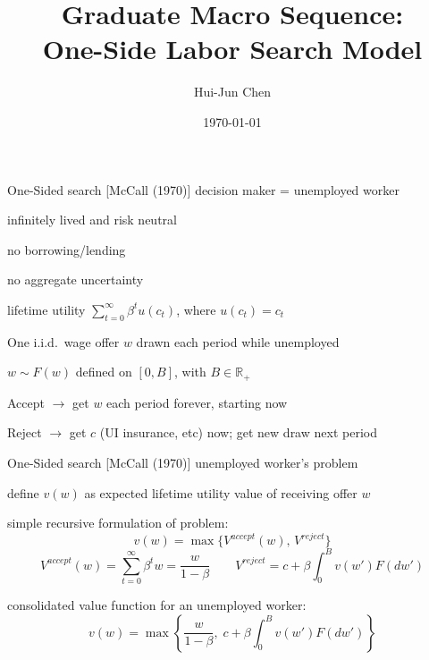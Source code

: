 \documentclass[aspectratio=169,xcolor=dvipsnames]{beamer}
\title[Lecture 4]{Graduate Macro Sequence:\\ One-Side Labor Search Model}
\author[Hui-Jun Chen]{Hui-Jun Chen}
\institute[]{National Tsing Hua University\\ Department of Economics}
\date{\today}
\let\tempone\itemize
\let\temptwo\enditemize
\renewenvironment{itemize}{\tempone\addtolength{\itemsep}{\fill}}{\temptwo}
\begin{document}
\begin{frame}
    \titlepage
\end{frame}


\begin{frame}{One-Sided search [McCall (1970)]}
\label{slide:McCall_01}
\small
decision maker = unemployed worker
\begin{itemize}
    \item infinitely lived and risk neutral
    \item no borrowing/lending
    \item no aggregate uncertainty
    \item lifetime utility $\sum_{t=0}^{\infty}\beta^t u(c_t)$, where $u(c_t)=c_t$
    \item One i.i.d.\ wage offer $w$ drawn each period while unemployed
    \item $w\sim F(w)$ defined on $[0,B]$, with $B\in\mathbb{R}_+$
    \item Accept $\rightarrow$ get $w$ each period forever, starting now
    \item Reject $\rightarrow$ get $c$ (UI insurance, etc) now; get new draw next period
\end{itemize}
\end{frame}

\begin{frame}{One-Sided search [McCall (1970)]}
\label{slide:McCall_02}
\small
unemployed worker's problem
\begin{itemize}
    \item define $v(w)$ as expected lifetime utility value of receiving offer $w$
    \item simple recursive formulation of problem:
    \[
        v(w)=\max\{V^{accept}(w),\,V^{reject}\}
    \]
    \[
        V^{accept}(w)=\sum_{t=0}^{\infty}\beta^t w=\frac{w}{1-\beta}
        \qquad
        V^{reject}=c+\beta\int_0^B v(w')F(dw')
    \]
    \item consolidated value function for an unemployed worker:
    \[
        v(w)=\max\left\{\frac{w}{1-\beta},\;c+\beta\int_0^B v(w')F(dw')\right\}
    \]
\end{itemize}
\end{frame}
\end{document}
